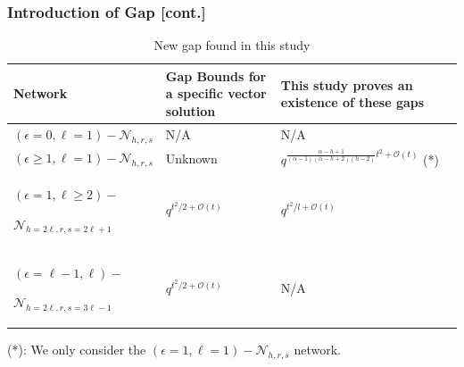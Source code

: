 \documentclass[c]{beamer}
\begin{document}
\begin{frame}[c]
\frametitle{Introduction of Gap [cont.]}
		\begin{table}
		
		\caption{New gap found in this study \label{tab:New-gap-found}}
		
		\begin{centering}
		\begin{tabular}{|>{\centering}p{0.30\paperwidth}|>{\centering}p{0.2\paperwidth}|>{\centering}p{0.3\paperwidth}|}
		\hline 
		\centering{}Network & \centering{}Gap Bounds for a specific vector solution \cite{Wachter-Zeh:2018} & \centering{}This study proves an existence of these gaps\tabularnewline
		\hline 
		\hline 
		\centering{}$\left(\epsilon=0,\ell=1\right)-\mathcal{N}_{h,r,s}$ & \centering{}N/A & \centering{}N/A\tabularnewline
		\hline 
		\centering{}$\left(\epsilon\geq1,\ell=1\right)-\mathcal{N}_{h,r,s}$ & \centering{}Unknown & \centering{}$q^{\frac{\alpha-h+1}{\left(\alpha-1\right)\left(\alpha-h+2\right)\left(h-2\right)}t^{2}+\mathcal{O}(t)}$
		({*})\tabularnewline
		\hline 
		\begin{centering}
		$(\epsilon=1,\ell\geq2)-$
		\par\end{centering}
		$\mathcal{N}_{h=2\ell,r,s=2\ell+1}$ & \centering{}$q^{t^{2}/2+\mathcal{O}\left(t\right)}$ & \centering{}$q^{t^{2}/l+\mathcal{O}\left(t\right)}$\tabularnewline
		\hline 
		\begin{centering}
		$\left(\epsilon=\ell-1,\ell\right)-$
		\par\end{centering}
		$\mathcal{N}_{h=2\ell,r,s=3\ell-1}$ & \centering{}$q^{t^{2}/2+\mathcal{O}\left(t\right)}$ & \centering{}N/A\tabularnewline
		\hline 
		\end{tabular}
		\par\end{centering}
		\begin{centering}
		({*}): We only consider the $\left(\epsilon=1,\ell=1\right)-\mathcal{N}_{h,r,s}$
		network.
		\par\end{centering}
		\end{table}
\end{frame}

\end{document}
